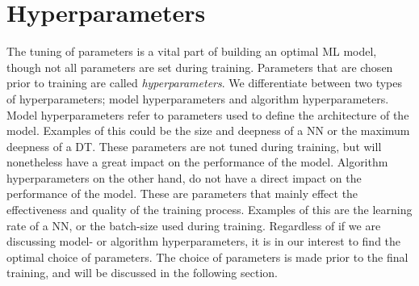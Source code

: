 \section{Hyperparameters}
The tuning of parameters is a vital part of building an optimal \ac{ML}
model, though not all parameters are set during training. Parameters 
that are chosen prior to training are called \emph{hyperparameters}. We differentiate
between two types of hyperparameters; model hyperparameters and algorithm 
hyperparameters. Model hyperparameters refer to parameters used to define the 
architecture of the model. Examples of this could be the size and deepness of 
a \ac{NN} or the maximum deepness of a \ac{DT}. These parameters are not tuned
during training, but will nonetheless have a great impact on the performance 
of the model. Algorithm hyperparameters on the other hand, do not have a direct impact 
on the performance of the model. These are parameters that mainly effect the 
effectiveness and quality of the training process. Examples of this are the 
learning rate of a \ac{NN}, or the batch-size used during training. Regardless 
of if we are discussing model- or algorithm hyperparameters, it is in our interest
to find the optimal choice of parameters. The choice of parameters is made 
prior to the final training, and will be discussed in the following section.